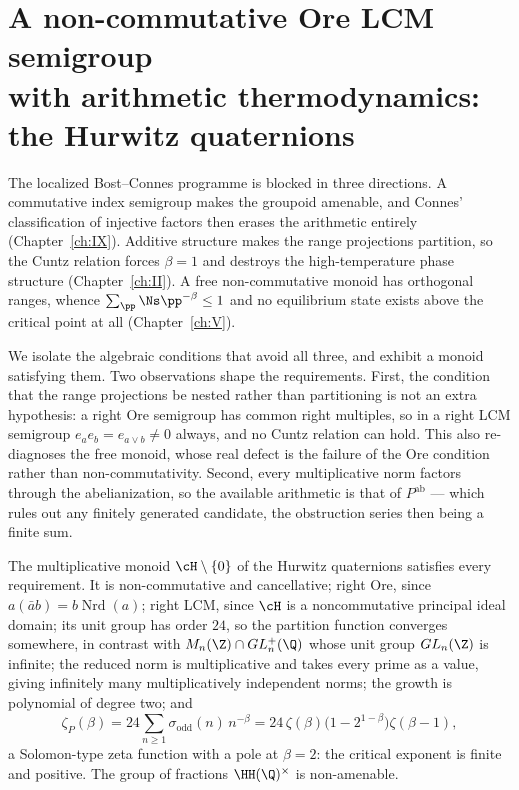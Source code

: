 \chapter[A non-commutative Ore LCM semigroup: the Hurwitz quaternions]{A non-commutative Ore LCM semigroup\\ with arithmetic thermodynamics:\\ the Hurwitz quaternions}\label{ch:X}
\renewcommand{\Nrd}{\operatorname{Nrd}}
\begin{summary}
The localized Bost--Connes programme is blocked in three directions. A commutative index
semigroup makes the groupoid amenable, and Connes' classification of injective factors then
erases the arithmetic entirely (Chapter~\ref{ch:IX}). Additive structure makes the range
projections partition, so the Cuntz relation forces $\beta=1$ and destroys the
high-temperature phase structure (Chapter~\ref{ch:II}). A free non-commutative monoid has orthogonal
ranges, whence $\sum_\pp\Ns\pp^{-\beta}\le1$ and no equilibrium state exists above the critical
point at all (Chapter~\ref{ch:V}).

We isolate the algebraic conditions that avoid all three, and exhibit a monoid satisfying
them. Two observations shape the requirements. First, the condition that the range
projections be nested rather than partitioning is not an extra hypothesis: a right Ore
semigroup has common right multiples, so in a right LCM semigroup $e_ae_b=e_{a\vee b}\ne0$
always, and no Cuntz relation can hold. This also re-diagnoses the free monoid, whose real
defect is the failure of the Ore condition rather than non-commutativity. Second, every
multiplicative norm factors through the abelianization, so the available arithmetic is that
of $P^{\mathrm{ab}}$ --- which rules out any finitely generated candidate, the obstruction
series then being a finite sum.

The multiplicative monoid $\cH\setminus\{0\}$ of the Hurwitz quaternions satisfies every
requirement. It is non-commutative and cancellative; right Ore, since
$a(\bar ab)=b\Nrd(a)$; right LCM, since $\cH$ is a noncommutative principal ideal domain; its
unit group has order $24$, so the partition function converges somewhere, in contrast with
$M_n(\Z)\cap GL_n^+(\Q)$ whose unit group $GL_n(\Z)$ is infinite; the reduced norm is
multiplicative and takes every prime as a value, giving infinitely many multiplicatively
independent norms; the growth is polynomial of degree two; and
\[
\zeta_P(\beta)=24\sum_{n\ge1}\sigma_{\mathrm{odd}}(n)\,n^{-\beta}
=24\,\zeta(\beta)\bigl(1-2^{1-\beta}\bigr)\zeta(\beta-1),
\]
a Solomon-type zeta function with a pole at $\beta=2$: the critical exponent is finite and
positive. The group of fractions $\HH(\Q)^\times$ is non-amenable.


\end{summary}
